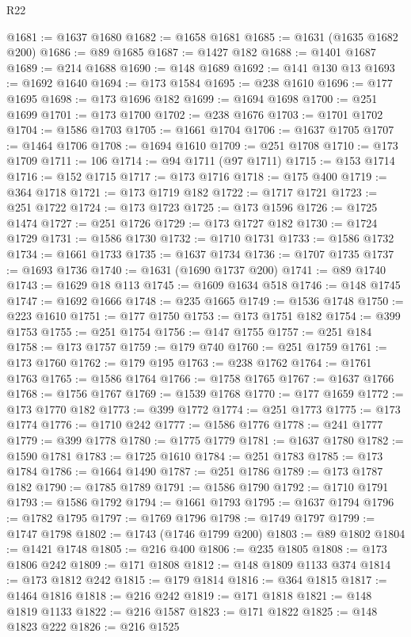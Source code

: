 \begin{lexlean}{R22}
\begin{coremodule}
@1681 := @1637 @1680
@1682 := @1658 @1681
@1685 := @1631 (@1635 @1682 @200)
@1686 := @89 @1685
@1687 := @1427 @182
@1688 := @1401 @1687
@1689 := @214 @1688
@1690 := @148 @1689
@1692 := @141 @130 @13
@1693 := @1692 @1640
@1694 := @173 @1584
@1695 := @238 @1610
@1696 := @177 @1695
@1698 := @173 @1696 @182
@1699 := @1694 @1698
@1700 := @251 @1699
@1701 := @173 @1700
@1702 := @238 @1676
@1703 := @1701 @1702
@1704 := @1586 @1703
@1705 := @1661 @1704
@1706 := @1637 @1705
@1707 := @1464 @1706
@1708 := @1694 @1610
@1709 := @251 @1708
@1710 := @173 @1709
@1711 := 106
@1714 := @94 @1711 (@97 @1711)
@1715 := @153 @1714
@1716 := @152 @1715
@1717 := @173 @1716
@1718 := @175 @400
@1719 := @364 @1718
@1721 := @173 @1719 @182
@1722 := @1717 @1721
@1723 := @251 @1722
@1724 := @173 @1723
@1725 := @173 @1596
@1726 := @1725 @1474
@1727 := @251 @1726
@1729 := @173 @1727 @182
@1730 := @1724 @1729
@1731 := @1586 @1730
@1732 := @1710 @1731
@1733 := @1586 @1732
@1734 := @1661 @1733
@1735 := @1637 @1734
@1736 := @1707 @1735
@1737 := @1693 @1736
@1740 := @1631 (@1690 @1737 @200)
@1741 := @89 @1740
@1743 := @1629 @18 @113
@1745 := @1609 @1634 @518
@1746 := @148 @1745
@1747 := @1692 @1666
@1748 := @235 @1665
@1749 := @1536 @1748
@1750 := @223 @1610
@1751 := @177 @1750
@1753 := @173 @1751 @182
@1754 := @399 @1753
@1755 := @251 @1754
@1756 := @147 @1755
@1757 := @251 @184
@1758 := @173 @1757
@1759 := @179 @740
@1760 := @251 @1759
@1761 := @173 @1760
@1762 := @179 @195
@1763 := @238 @1762
@1764 := @1761 @1763
@1765 := @1586 @1764
@1766 := @1758 @1765
@1767 := @1637 @1766
@1768 := @1756 @1767
@1769 := @1539 @1768
@1770 := @177 @1659
@1772 := @173 @1770 @182
@1773 := @399 @1772
@1774 := @251 @1773
@1775 := @173 @1774
@1776 := @1710 @242
@1777 := @1586 @1776
@1778 := @241 @1777
@1779 := @399 @1778
@1780 := @1775 @1779
@1781 := @1637 @1780
@1782 := @1590 @1781
@1783 := @1725 @1610
@1784 := @251 @1783
@1785 := @173 @1784
@1786 := @1664 @1490
@1787 := @251 @1786
@1789 := @173 @1787 @182
@1790 := @1785 @1789
@1791 := @1586 @1790
@1792 := @1710 @1791
@1793 := @1586 @1792
@1794 := @1661 @1793
@1795 := @1637 @1794
@1796 := @1782 @1795
@1797 := @1769 @1796
@1798 := @1749 @1797
@1799 := @1747 @1798
@1802 := @1743 (@1746 @1799 @200)
@1803 := @89 @1802
@1804 := @1421 @1748
@1805 := @216 @400
@1806 := @235 @1805
@1808 := @173 @1806 @242
@1809 := @171 @1808
@1812 := @148 @1809 @1133 @374
@1814 := @173 @1812 @242
@1815 := @179 @1814
@1816 := @364 @1815
@1817 := @1464 @1816
@1818 := @216 @242
@1819 := @171 @1818
@1821 := @148 @1819 @1133
@1822 := @216 @1587
@1823 := @171 @1822
@1825 := @148 @1823 @222
@1826 := @216 @1525

\end{coremodule}
\end{lexlean}
